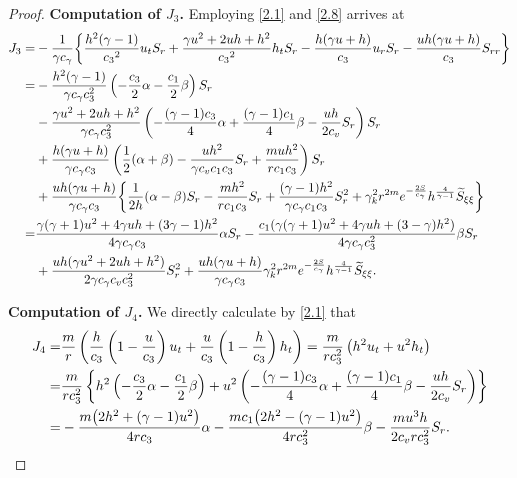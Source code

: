 \documentclass[11pt,reqno]{article}
\numberwithin{equation}{section}
\begin{document}
\begin{proof}
\noindent\textbf{Computation of $J_3$.} Employing \eqref{2.1} and
\eqref{2.8} arrives at
 \begin{align}
J_3
=& -\frac{1}{\gamma c_\gamma}\bigg\{
       \frac{h^2(\gamma-1)}{{c_3}^2}u_tS_r+\frac{\gamma u^2+2uh+h^2}{{c_3}^2}h_tS_r- \frac{h(\gamma u+h)}{c_3}u_rS_r- \frac{uh(\gamma u+h)}{c_3}S_{rr}\bigg\}\nonumber\\
=&
-\frac{h^2(\gamma-1)}{\gamma c_\gamma c_3^2}\left( -\frac{c_3}{2}\alpha - \frac{c_1}{2}\beta \right)S_r \nonumber \\
&  -\frac{\gamma u^2+2uh+h^2}{\gamma c_\gamma c_3^2}\left( -\frac{(\gamma-1)c_3}{4}\alpha + \frac{(\gamma-1)c_1}{4}\beta - \frac{uh}{2c_v} S_r \right)S_r \nonumber \\
& + \frac{h(\gamma u+h)}{\gamma c_\gamma c_3}\left( \frac12(\alpha+\beta) - \frac{uh^2}{\gamma c_v c_1 c_3} S_r + \frac{m u h^2}{r c_1 c_3} \right)S_r \nonumber \\
& + \frac{uh(\gamma u+h)}{\gamma c_\gamma c_3}\bigg\{ \frac{1}{2h}(\alpha-\beta) S_r - \frac{m h^2}{r c_1 c_3} S_r + \frac{(\gamma-1) h^2}{\gamma c_\gamma c_1 c_3} S_r^2 + \gamma_k^2 r^{2m} e^{-\frac{2S}{c_\gamma}} h^{\frac{4}{\gamma-1}} \widetilde{S}_{\xi\xi} \bigg\}\nonumber\\
= & \frac{\gamma(\gamma+1)u^2+4\gamma uh + (3\gamma-1)h^2}{4\gamma c_\gamma c_3} \alpha S_r
    - \frac{c_1(\gamma(\gamma+1)u^2+4\gamma uh+(3-\gamma)h^2)}{4\gamma c_\gamma c_3^2} \beta S_r  \nonumber\\
& + \frac{uh(\gamma u^2+2uh+h^2)}{2\gamma c_\gamma c_v c_3^2}  S_r^2 +  \frac{uh(\gamma u+h)}{\gamma c_\gamma c_3} \gamma_k^2 r^{2m} e^{-\frac{2S}{c_\gamma}} h^{\frac{4}{\gamma-1}}  \widetilde{S}_{\xi\xi}. \notag
 \end{align}

\noindent\textbf{Computation of $J_4$.} We directly calculate by \eqref{2.1} that
 \begin{align}
 J_4
=& \frac{m}{r}\left( \frac{h}{c_3}\left( 1 - \frac{u}{c_3} \right) u_t + \frac{u}{c_3}\left( 1 - \frac{h}{c_3} \right) h_t \right) = \frac{m}{r c_3^2}\left( h^2 u_t + u^2 h_t \right) \nonumber\\
=& \frac{m}{r c_3^2}\left\{ h^2\left( -\frac{c_3}{2}\alpha - \frac{c_1}{2}\beta \right) + u^2\left( -\frac{(\gamma-1)c_3}{4}\alpha + \frac{(\gamma-1)c_1}{4}\beta - \frac{u h}{2c_v} S_r \right) \right\} \nonumber\\
=& -\frac{m\big( 2h^2 + (\gamma-1)u^2 \big)}{4r c_3} \alpha - \frac{m c_1\big( 2h^2 - (\gamma-1)u^2 \big)}{4r c_3^2} \beta - \frac{m u^3 h}{2c_v r c_3^2} S_r. \notag
 \end{align}


\end{proof}
\end{document}
